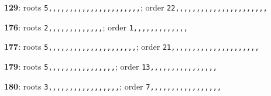 \noindent \textbf{129}: roots \texttt{5,,,,,,,,,,,,,,,,,,,,,,}; order \texttt{22,,,,,,,,,,,,,,,,,,,,,,}\par
\noindent \textbf{176}: roots \texttt{2,,,,,,,,,,,,,}; order \texttt{1,,,,,,,,,,,,,}\par
\noindent \textbf{177}: roots \texttt{5,,,,,,,,,,,,,,,,,,,,,}; order \texttt{21,,,,,,,,,,,,,,,,,,,,,}\par
\noindent \textbf{179}: roots \texttt{5,,,,,,,,,,,,,,,,}; order \texttt{13,,,,,,,,,,,,,,,,}\par
\noindent \textbf{180}: roots \texttt{3,,,,,,,,,,,,,,,,,}; order \texttt{7,,,,,,,,,,,,,,,,,}\par
